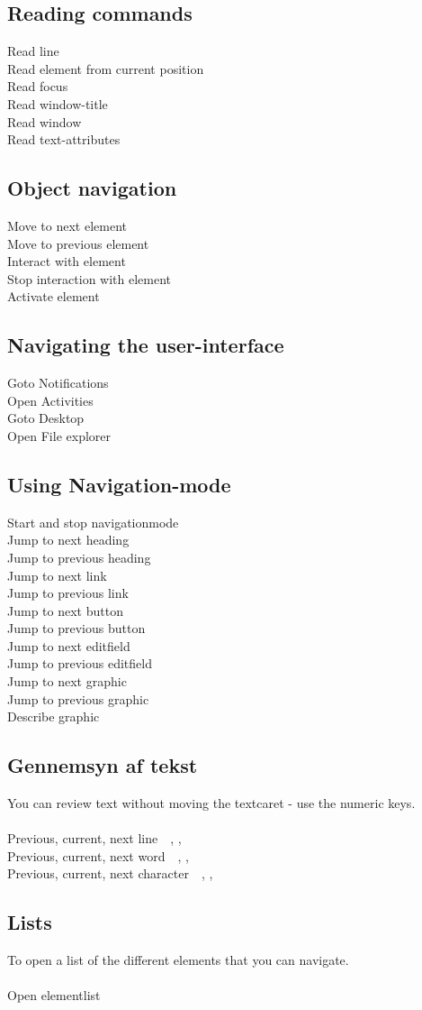 \documentclass[a4paper, landscape, 11pt]{scrartcl}
\newcommand{\command}[2]{#1~\dotfill{}~#2\\} %
\begin{document}
\begin{multicols}{2}
\subsection*{Reading commands}
\command{Read line}{}
\command{Read element from current position}{\keys{NVDA + \arrowkeydown}}
\command{Read focus}{}
\command{Read window-title}{}
\command{Read window}{}
\command{Read text-attributes}{}

\subsection*{Object navigation}
\command{Move to next element}{}
\command{Move to previous element}{}
\command{Interact with element}{}
\command{Stop interaction with element}{\keys{NVDA  + \arrowkeyup}}
\command{Activate element}{}

\subsection*{Navigating the user-interface}
\command{Goto Notifications}{}
\command{Open Activities}{}
\command{Goto Desktop}{}
\command{Open File explorer}{}

\subsection*{Using Navigation-mode}
\command{Start and stop navigationmode}{}
\command{Jump to next heading}{}
\command{Jump to previous heading}{}
\command{Jump to next link}{}
\command{Jump to previous link}{\keys{\shift + h}}
\command{Jump to next button}{}
\command{Jump to previous button}{}
\command{Jump to next editfield}{}
\command{Jump to previous editfield}{}
\command{Jump to next graphic}{}
\command{Jump to previous graphic}{}
\command{Describe graphic}{}

\subsection*{Gennemsyn af tekst}
You can review text without moving the textcaret - use the numeric keys. \\ \\
\command{Previous, current, next line}{, , \keys{9}}
\command{Previous, current, next word}{, , \keys{6}}
\command{Previous, current, next character}{, , \keys{3}}

\subsection*{Lists}
To open a list of the different  elements that you can navigate. \\ \\
\command{Open elementlist}{}

\end{multicols}

\hrulefill{}
\end{document}
